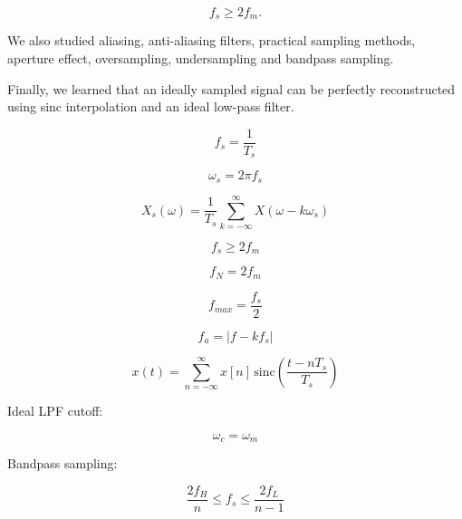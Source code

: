 \[
f_s\ge2f_m.
\]

We also studied aliasing, anti-aliasing filters, practical sampling methods,
aperture effect, oversampling, undersampling and bandpass sampling.

Finally, we learned that an ideally sampled signal can be perfectly reconstructed
using sinc interpolation and an ideal low-pass filter.


\begin{tcolorbox}[title=One-Minute Revision,colback=blue!5]

\[
f_s=\frac{1}{T_s}
\]

\[
\omega_s=2\pi f_s
\]

\[
X_s(\omega)=
\frac{1}{T_s}
\sum_{k=-\infty}^{\infty}
X(\omega-k\omega_s)
\]

\[
f_s\ge2f_m
\]

\[
f_N=2f_m
\]

\[
f_{max}=\frac{f_s}{2}
\]

\[
f_a=|f-kf_s|
\]

\[
x(t)=
\sum_{n=-\infty}^{\infty}
x[n]\,
\mathrm{sinc}\left(\frac{t-nT_s}{T_s}\right)
\]

Ideal LPF cutoff:

\[
\omega_c=\omega_m
\]

Bandpass sampling:

\[
\frac{2f_H}{n}
\le
f_s
\le
\frac{2f_L}{n-1}
\]

\end{tcolorbox}
